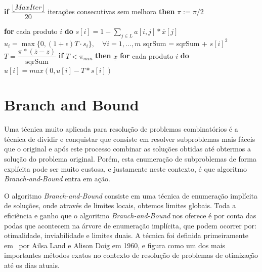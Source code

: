 \documentclass{article}
\newenvironment{algoritmo}[1][]
  {\begin{algorithm}[#1]
     \selectlanguage{brazil}%
     \floatname{algorithm}{Algoritmo}%
  }
  {\end{algorithm}}
\begin{document}
\begin{algoritmo}[H]
\begin{algorithmic}[1]
            \Statex
            \Statex {}
            \State \indent \textbf{if} {{$\dfrac{\lfloor{MaxIter}\rfloor}{20}$} iterações consecutivas sem melhora} \textbf{then} 
            \State \indent \indent $\pi := \pi/2$
            
    
            \Statex
            \Statex {}
            \State \indent \textbf{for}{ cada produto $i$} \textbf{do}
            \State \indent \indent $s[i] = 1 - \sum_{j\in L} a[i,j]*\overline{x}[j]$
            \State \indent \indent $u_i = \max \{0,(1+ \epsilon) T \cdot s_i\}, \quad \forall i= 1,\dots,m$
            \State \indent \indent sqrSum = sqrSum + $s[i]^2$
            \State \indent$T = \dfrac{\pi * (\overline{z} - \underline{z})}{\text{sqrSum}} $
            \State \indent \textbf{if}{ $T < \pi_{min}$}\textbf{ then}
            \State \indent \indent \Return $\underline{x}$ 
            \State \indent \textbf{for} { cada produto $i$} \textbf{do}
            \State \indent \indent $u[i] = max(0, u[i] - T*s[i]) $
        \end{algorithmic}
    \end{algoritmo}

	
	\section{Branch and Bound}\label{sec:BB}
	Uma técnica muito aplicada para resolução de problemas combinatórios é a técnica de dividir e conquistar que consiste em resolver subproblemas mais fáceis que o original e após este processo combinar as soluções obtidas até obtermos a solução do problema original. Porém, esta enumeração de subproblemas de forma explícita pode ser muito custosa, e justamente neste contexto, é que algoritmo \emph{Branch-and-Bound} entra em ação.
	
	O algoritmo \emph{Branch-and-Bound} consiste em uma técnica de enumeração implícita de soluções, onde através de limites locais, obtemos limites globais. Toda a eficiência e ganho que o algoritmo \emph{Branch-and-Bound} nos oferece é por conta das podas que acontecem na árvore de enumeração implícita, que podem ocorrer por: otimalidade, inviabilidade e limites duais. A técnica foi definida primeiramente em~\cite{Land} por Ailsa Land e Alison Doig em 1960, e figura como um dos mais importantes métodos exatos no contexto de resolução de problemas de otimização até os dias atuais.
	
\end{document}
